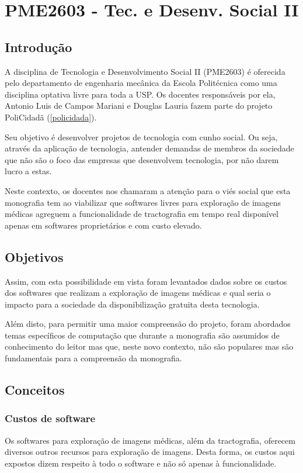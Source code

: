 \chapter{PME2603 - Tec. e Desenv. Social II}
\section{Introdução}
A disciplina de Tecnologia e Desenvolvimento Social II (PME2603) é oferecida pelo departamento de engenharia mecânica da Escola Politécnica como uma disciplina optativa livre para toda a USP. Os docentes responsáveis por ela, Antonio Luis de Campos Mariani e Douglas Lauria fazem parte do projeto PoliCidadã (\ref{policidada}).

Seu objetivo é desenvolver projetos de tecnologia com cunho social. Ou seja, através da aplicação de tecnologia, antender demandas de membros da sociedade que não são o foco das empresas que desenvolvem tecnologia, por não darem lucro a estas.

Neste contexto, os docentes nos chamaram a atenção para o viés social que esta monografia tem ao viabilizar que softwares livres para exploração de imagens médicas agreguem a funcionalidade de tractografia em tempo real disponível apenas em softwares proprietários e com custo elevado.

\section{Objetivos}
Assim, com esta possibilidade em vista foram levantados dados sobre os custos dos softwares que realizam a exploração de imagens médicas e qual seria o impacto para a sociedade da disponibilização gratuita desta tecnologia.

Além disto, para permitir uma maior compreensão do projeto, foram abordados temas específicos de computação que durante a monografia são assumidos de conhecimento do leitor mas que, neste novo contexto, não são populares mas são fundamentais para a compreensão da monografia.

\section{Conceitos}
  \subsection{Custos de software}
  Os softwares para exploração de imagens médicas, além da tractografia, oferecem diversos outros recursos para exploração de imagens. Desta forma, os custos aqui expostos dizem respeito à todo o software e não só apenas à funcionalidade.
  
